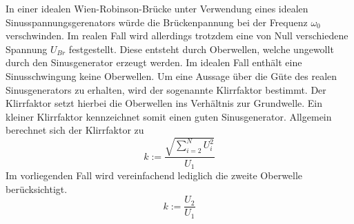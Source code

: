 In einer idealen Wien-Robinson-Brücke unter Verwendung eines idealen Sinusspannungsgerenators würde die Brückenpannung bei der Frequenz $\omega_0$ verschwinden. Im realen Fall wird allerdings trotzdem eine von Null verschiedene Spannung $U_{Br}$ festgestellt.
Diese entsteht durch Oberwellen, welche ungewollt durch den Sinusgenerator erzeugt werden. Im idealen Fall enthält eine Sinusschwingung keine Oberwellen. Um eine Aussage über die Güte des realen Sinusgenerators zu erhalten, wird der sogenannte Klirrfaktor bestimmt.
Der Klirrfaktor setzt hierbei die Oberwellen ins Verhältnis zur Grundwelle. Ein kleiner Klirrfaktor kennzeichnet somit einen guten Sinusgenerator.
Allgemein berechnet sich der Klirrfaktor zu
\begin{equation}
k:=\frac{\sqrt{\sum_{i=2}^{N}{U_i^2}}}{U_1}
\end{equation}
Im vorliegenden Fall wird vereinfachend lediglich die zweite Oberwelle berücksichtigt.
\begin{equation}
  \label{eqn:klirrfaktor}
k:=\frac{U_2}{U_1}
\end{equation}
